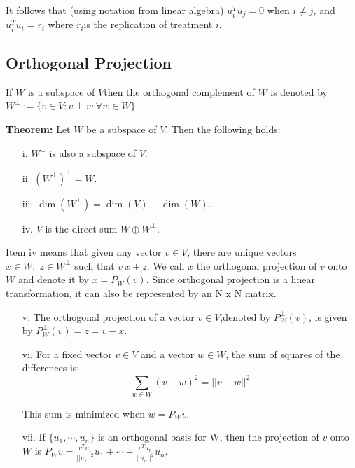 \documentclass[12pt, oneside]{article}
\begin{document}
It follows that (using notation from linear algebra) $u_{i}^{T}u_{j} = 0$ when $i \neq j$, and $u_{i}^{T}u_{i} = r_{i}$ where $r_{i}$is the replication of treatment $i$.

\subsection{Orthogonal Projection}

If $W$ is a subspace of $V$then the orthogonal complement of $W$ is denoted by $W^{\perp} := \{v \in V : v \perp w \;\forall w \in W \}$. \newline

\textbf{Theorem:} Let $W$ be a subspace of $V$. Then the following holds:

\begin{enumerate}
    \item[i.] $W^{\perp}$ is also a subspace of $V$.
    \item[ii.] $(W^{\perp})^{\perp} = W$.
    \item[iii.] $ \dim (W^{\perp}) = \dim(V) - \dim(W)$.
    \item[iv.] $V$ is the direct sum $W \oplus W^{\perp}$.
    
\end{enumerate}

Item iv means that given any vector $v \in V$, there are unique vectors $x \in W, \; z \in W^{\perp}$ such that $v \ x + z$. We call $x$ the orthogonal projection of $v$ onto $W$ and denote it by $x = P_{W}(v)$. Since orthogonal projection is a linear transformation, it can also be represented by an N x N matrix.

\begin{enumerate}
\item[v.] The orthogonal projection of a vector $v \in V$,denoted by $P^{\perp}_{W}(v)$, is given by $P^{\perp}_{W}(v) = z = v - x$.

\item[vi.] For a fixed vector $v \in V$ and a vector $w \in W$, the sum of squares of the differences is: \[\sum_{w \in W} (v - w)^{2} = ||v - w||^{2}\]

This sum is minimized when $w = P_{W}v$.

\item[vii.] If $\{ u_{1}, \cdots , u_{n}\}$ is an orthogonal basis for W, then the projection of $v$ onto $W$ is $P_{W}v = \frac{v^{T}u_{1}}{||u_{1}||^{2}} u_{1} + \cdots + \frac{v^{T}u_{n}}{||u_{n}||^{2}} u_{n}$.

\end{enumerate}
\end{document}
